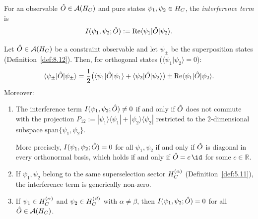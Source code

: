 \begin{definition}
\label{def:8.13}
For an observable $\hat{O} \in \mathcal{A}(H_C)$ and pure states
$\psi_1, \psi_2 \in H_C$, the \emph{interference term} is
\[
  I(\psi_1, \psi_2; \hat{O})
  := \mathrm{Re}\langle\psi_1|\hat{O}|\psi_2\rangle.
\]
\end{definition}

\begin{theorem}
\label{thm:8.6}
Let $\hat{O} \in \mathcal{A}(H_C)$ be a constraint observable and let
$\psi_\pm$ be the superposition states
\textup{(}Definition~\textup{\ref{def:8.12})}.  Then, for
orthogonal states ($\langle\psi_1|\psi_2\rangle = 0$):
\[
  \langle\psi_\pm|\hat{O}|\psi_\pm\rangle
  = \frac{1}{2}\bigl(
    \langle\psi_1|\hat{O}|\psi_1\rangle
    + \langle\psi_2|\hat{O}|\psi_2\rangle
  \bigr)
  \pm \mathrm{Re}\langle\psi_1|\hat{O}|\psi_2\rangle.
\]
Moreover:
\begin{enumerate}
  \item[\textup{(i)}] The interference term
    $I(\psi_1, \psi_2; \hat{O}) \neq 0$ if and only if $\hat{O}$ does not
    commute with the projection
    $P_{12} := |\psi_1\rangle\langle\psi_1| + |\psi_2\rangle\langle\psi_2|$
    restricted to the 2-dimensional subspace
    $\mathrm{span}\{\psi_1, \psi_2\}$.

    More precisely, $I(\psi_1, \psi_2; \hat{O}) = 0$ for all
    $\psi_1, \psi_2$ if and only if $\hat{O}$ is diagonal in every
    orthonormal basis, which holds if and only if
    $\hatO = c\,\id$ for some $c \in \mathbb{R}$.
  \item[\textup{(ii)}] If $\psi_1, \psi_2$ belong to the same
    superselection sector $H_C^{(\alpha)}$
    \textup{(}Definition~\textup{\ref{def:5.11})}, the interference
    term is generically non-zero.
  \item[\textup{(iii)}] If $\psi_1 \in H_C^{(\alpha)}$ and
    $\psi_2 \in H_C^{(\beta)}$ with $\alpha \neq \beta$, then
    $I(\psi_1, \psi_2; \hat{O}) = 0$ for all $\hat{O} \in \mathcal{A}(H_C)$.
\end{enumerate}
\end{theorem}

